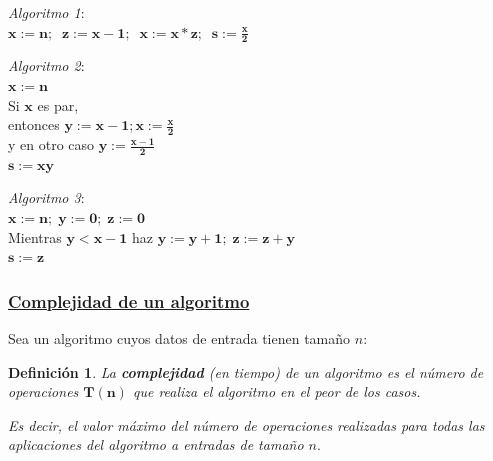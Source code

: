 \documentclass[ebook,oneside]{memoir}
\newtheorem{defn}[thm]{Definición}
\newcommand{\bolds}[1]{\boldsymbol{#1}}
\begin{document}
 \noindent\emph{Algoritmo 1}: \\ $\bolds{x:=n;\;\; z:= x-1;\;\; x:= x*z;\; \; s:= \frac{x}{2}}$

\vspace{0.2cm}

 \noindent\emph{Algoritmo 2}: \\ $\bolds{x:=n}$\\ \textsf{Si} $\bolds{x}$ \textrm{es par},\\
        \hspace*{0.2cm} \textsf{entonces} $\bolds{y:=x-1; x:=\frac{x}{2}}$\\
        \hspace*{0.2cm} \textsf{y en otro caso} $\bolds{y:=\frac{x-1}{2}}$\\
        $\bolds{s:=xy}$

\vspace{0.2cm}

 \noindent\emph{Algoritmo 3}: \\ $\bolds{x:=n;\; y:=0;\; z:=0}$\\
        \textsf{Mientras} $\bolds{y<x-1}$ \textsf{haz} $\bolds{y:=y+1;\; z:=z+y}$\\
        $\bolds{s:=z}$



\subsubsection{\underline{Complejidad de un algoritmo}}

Sea un algoritmo cuyos datos de entrada tienen tama\~{n}o $n$:
\vspace{0.4cm}

\begin{defn}
La \textbf{complejidad} (en tiempo) de un algoritmo es el n\'{u}\-me\-ro de operaciones $\bolds{T(n)}$ que realiza el algoritmo en el peor de los casos.


\vspace{0.2cm}

Es decir, el valor m\'{a}ximo del n\'{u}mero de operaciones realizadas para todas las aplicaciones del algoritmo a entradas de tama\~{n}o $n.$
\end{defn}
\end{document}

